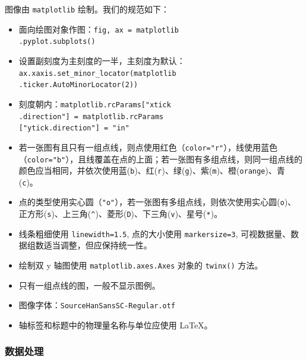 图像由 \verb|matplotlib| 绘制。我们的规范如下：
\begin{itemize}
  \item 面向绘图对象作图：\verb|fig, ax = matplotlib|\\\verb|.pyplot.subplots()|
  \item 设置副刻度为主刻度的一半，主刻度为默认：\verb|ax.xaxis.set_minor_locator(matplotlib|\\\verb|.ticker.AutoMinorLocator(2))|
  \item 刻度朝内：\verb|matplotlib.rcParams["xtick|\\\verb|.direction"] = matplotlib.rcParams|\\\verb|["ytick.direction"] = "in"|
  \item 若一张图有且只有一组点线，则点使用红色（\verb|color="r"|），线使用蓝色（\verb|color="b"|），且线覆盖在点的上面；若一张图有多组点线，则同一组点线的颜色应当相同，并依次使用蓝(\verb|b|)、红(\verb|r|)、绿(\verb|g|)、紫(\verb|m|)、橙(\verb|orange|)、青(\verb|c|)。
  \item 点的类型使用实心圆（\verb|"o"|），若一张图有多组点线，则依次使用实心圆(\verb|o|)、正方形(\verb|s|)、上三角(\verb|^|)、菱形(\verb|D|)、下三角(\verb|v|)、星号(\verb|*|)。
  \item 线条粗细使用 \verb|linewidth=1.5|, 点的大小使用 \verb|markersize=3|, 可视数据量、数据组数适当调整，但应保持统一性。
  \item 绘制双 y 轴图使用 \verb|matplotlib.axes.Axes| 对象的 \verb|twinx()| 方法。
  \item 只有一组点线的图，一般不显示图例。
  \item 图像字体：\verb|SourceHanSansSC-Regular.otf|
  \item 轴标签和标题中的物理量名称与单位应使用 \LaTeX{}。
\end{itemize}

\subsubsection{数据处理}

